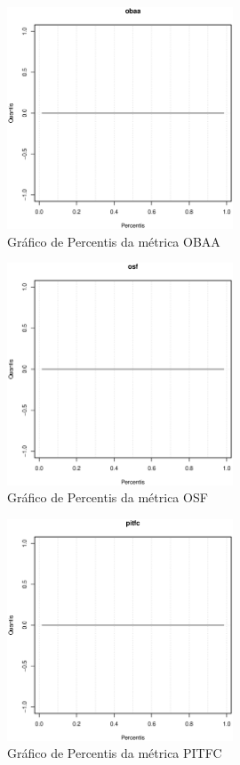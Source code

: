 \begin{apendicesenv}
\newpage

\begin{figure}[h]
  \centering
  \includegraphics[width=0.6\textwidth]
      {dados/linux/obaa.eps}
  \caption{Gráfico de Percentis da métrica OBAA}
\end{figure}

\begin{figure}[h]
  \centering
  \includegraphics[width=0.6\textwidth]
      {dados/linux/osf.eps}
  \caption{Gráfico de Percentis da métrica OSF}
\end{figure}

\newpage

\begin{figure}[h]
  \centering
  \includegraphics[width=0.6\textwidth]
      {dados/linux/pitfc.eps}
  \caption{Gráfico de Percentis da métrica PITFC}
\end{figure}


\end{apendicesenv}
